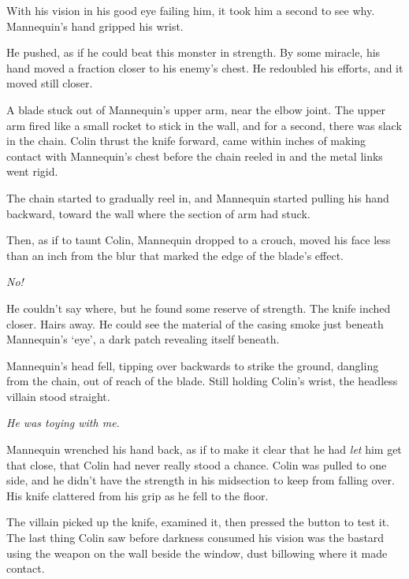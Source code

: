 With his vision in his good eye failing him, it took him a second to see why.  Mannequin's hand gripped his wrist.



He pushed, as if he could beat this monster in strength.  By some miracle, his hand moved a fraction closer to his enemy's chest.  He redoubled his efforts, and it moved still closer.



A blade stuck out of Mannequin's upper arm, near the elbow joint.  The upper arm fired like a small rocket to stick in the wall, and for a second, there was slack in the chain.  Colin thrust the knife forward, came within inches of making contact with Mannequin's chest before the chain reeled in and the metal links went rigid.



The chain started to gradually reel in, and Mannequin started pulling his hand backward, toward the wall where the section of arm had stuck.



Then, as if to taunt Colin, Mannequin dropped to a crouch, moved his face less than an inch from the blur that marked the edge of the blade's effect.



\emph{No!}



He couldn't say where, but he found some reserve of strength.  The knife inched closer.  Hairs away.  He could see the material of the casing smoke just beneath Mannequin's `eye', a dark patch revealing itself beneath.



Mannequin's head fell, tipping over backwards to strike the ground, dangling from the chain, out of reach of the blade.  Still holding Colin's wrist, the headless villain stood straight.



\emph{He was toying with me.}



Mannequin wrenched his hand back, as if to make it clear that he had \emph{let} him get that close, that Colin had never really stood a chance.  Colin was pulled to one side, and he didn't have the strength in his midsection to keep from falling over.  His knife clattered from his grip as he fell to the floor.



The villain picked up the knife, examined it, then pressed the button to test it.  The last thing Colin saw before darkness consumed his vision was the bastard using the weapon on the wall beside the window, dust billowing where it made contact.



